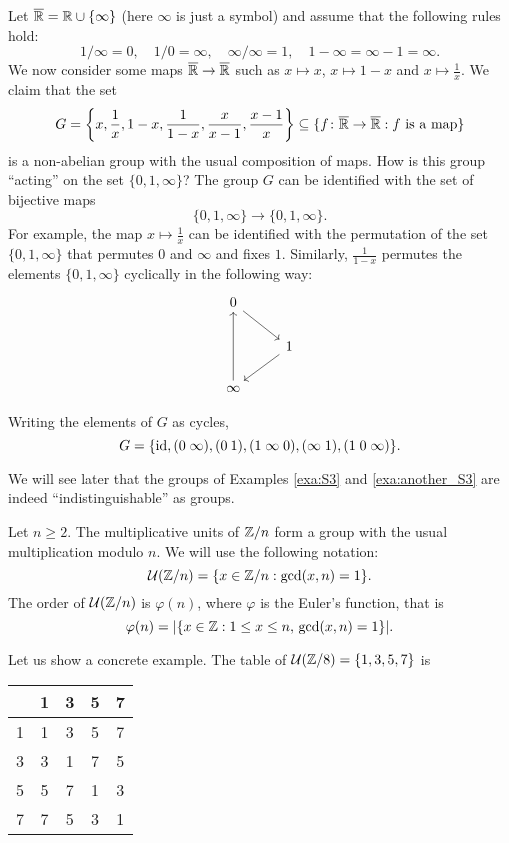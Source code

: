 \begin{example}
\label{exa:another_S3}
Let $\overline{\mathbb{R}}=\mathbb{R}\cup\{\infty\}$ (here $\infty$ is just a symbol) 
and assume that the following rules hold: 
\[
1/\infty=0,
\quad 1/0=\infty,
\quad \infty/\infty=1,
\quad 1-\infty=\infty-1=\infty.
\]
We now consider some maps $\overline{\mathbb{R}}\to\overline{\mathbb{R}}$ such as  
$x\mapsto x$, $x\mapsto 1-x$ and $x\mapsto\frac{1}{x}$. 
We claim that 
the set 
\[
G=\left\{x,\frac{1}{x},1-x,\frac{1}{1-x},\frac{x}{x-1},\frac{x-1}{x}\right\}
\subseteq\{f\colon\overline{\mathbb{R}}\to\overline{\mathbb{R}}:f\text{ is a map}\}
\]
is a non-abelian group with the usual composition of maps. How is this group ``acting'' on 
the set $\{0,1,\infty\}$? 
The group 
$G$ can be identified with the set of bijective maps 
\[
\{0,1,\infty\}\to\{0,1,\infty\}.
\]
For example, 
the map $x\mapsto\frac{1}{x}$ can be identified with the permutation of
the set 
$\{0,1,\infty\}$ that permutes $0$ and $\infty$ and fixes $1$. Similarly, 
$\frac{1}{1-x}$ permutes the elements $\{0,1,\infty\}$ cyclically 
in the following way:
\[
\begin{tikzcd}
        0 \\
        & 1 \\
        \infty
        \arrow[from=1-1, to=2-2]
        \arrow[from=2-2, to=3-1]
        \arrow[from=3-1, to=1-1]
\end{tikzcd}\]
\end{example}
Writing the elements of $G$ as cycles, 
\[
G=\{\operatorname{id},
(0\;\infty),
(0\:1),
(1\;\infty\;0),
(\infty\;1),
(1\;0\;\infty)\}.
\]

We will see later that the 
groups of Examples \ref{exa:S3} and \ref{exa:another_S3} are
indeed ``indistinguishable'' as groups. 

\begin{example}
Let $n\geq2$. The multiplicative units of $\mathbb{Z}/n$ form a group 
with the usual multiplication modulo $n$. 
We will use the following notation:
\[
\mathcal{U}(\mathbb{Z}/n)=\{x\in\mathbb{Z}/n:\gcd(x,n)=1\}.
\]
The order of $\mathcal{U}(\mathbb{Z}/n)$ is $\varphi(n)$, where $\varphi$ 
is the Euler's function, that is 
\[
\varphi(n)=|\{x\in\mathbb{Z}:1\leq x\leq n,\,\gcd(x,n)=1\}|.
\]

Let us show a concrete example. The table of 
$\mathcal{U}(\mathbb{Z}/8)=\{1,3,5,7\}$
is
\begin{center}
  \begin{tabular}{l|cccc}
     &1&3&5&7 \\
    \hline
    1 & 1 & 3 & 5 & 7\\
    3 & 3 & 1 & 7 & 5\\
    5 & 5 & 7 & 1 & 3\\
    7 & 7 & 5 & 3 & 1
  \end{tabular}
\end{center}
\end{example}



